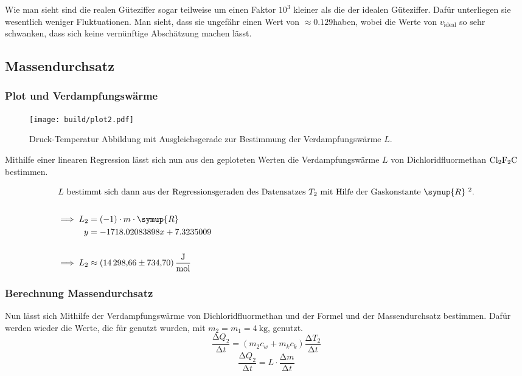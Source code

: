 Wie man sieht sind die realen Güteziffer sogar teilweise um einen Faktor $10^3$ kleiner als die der idealen Güteziffer.
Dafür unterliegen sie wesentlich weniger Fluktuationen. Man sieht, dass sie ungefähr einen Wert von $\approx 0.129$haben, 
wobei die Werte von $v_\text{ideal}$ so sehr schwanken, dass sich keine vernünftige Abschätzung machen lässt.
\newpage
\subsection{Massendurchsatz}
\subsubsection{Plot und Verdampfungswärme}

\begin{figure}
    \centering
    \texttt{[image: build/plot2.pdf]}
    \caption{Druck-Temperatur Abbildung mit Ausgleichsgerade zur Bestimmung der Verdampfungswärme $L$.}
\end{figure}

Mithilfe einer linearen Regression lässt sich nun aus den geploteten Werten 
die Verdampfungswärme $L$ von Dichloridfluormethan $\ce{Cl2F2C}$ bestimmen.

\begin{align*}
\intertext{$L$ bestimmt sich dann aus der Regressionsgeraden des Datensatzes $T_2$
 mit Hilfe der Gaskonstante $\symup{R}$ \footnotemark[2].}
\\
\implies L_2&=(-1) \cdot m \cdot \symup{R}\\
y&=-1718.02083898x+7.3235009\\
\\
\implies L_2&\approx\SI{14298.66+-734.7}{\joule\per\mol}
\end{align*}



\subsubsection{Berechnung Massendurchsatz}

Nun lässt sich Mithilfe der Verdampfungswärme von Dichloridfluormethan und der Formel  und  der Massendurchsatz bestimmen.
Dafür werden wieder die Werte, die für  genutzt wurden, mit $m_2= m_1= \SI{4}{\kilo\gram}$, genutzt.
\begin{equation}
    \frac{\increment Q_2}{\increment t} = \left(m_2 c_w + m_k c_k \right)\frac{\increment T_2}{\increment t}
    \label{eqn:delQ2}
\end{equation}
\begin{equation}
    \frac{\increment Q_2}{\increment t} = L\cdot \frac{\increment m}{\increment t}
    \label{eqn:mass}
\end{equation}

